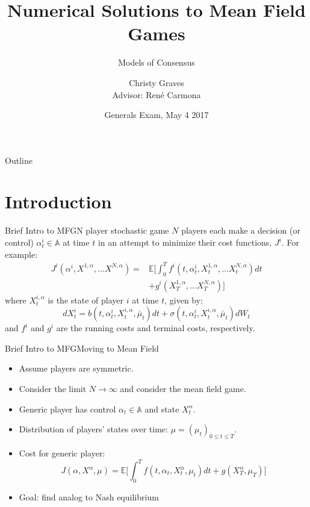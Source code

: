 \documentclass{beamer}
\title{Numerical Solutions to Mean Field Games}
\subtitle{Models of Consensus}
\author[Christy Graves]{Christy Graves\\{\small Advisor: Ren\'{e} Carmona}}
\institute[Princeton University] %
{
	Program in Applied and Computational Mathematics\\
	Princeton University
}
\date{Generals Exam, May 4 2017}
\begin{document}
\begin{frame}
  \titlepage
\end{frame}

\begin{frame}{Outline}
  \tableofcontents
\end{frame}

\section{Introduction}
\begin{frame}{Brief Intro to MFG}{N player stochastic game}
		$N$ players each make a decision (or control) $\alpha_t^i \in \mathbb{A}$ at time $t$ in an attempt to minimize their cost functions, $J^i$. For example:
		\begin{equation}
		\begin{split}
		J^i(\alpha^i,X^{1,\alpha},...X^{N,\alpha})=&\mathbb{E}\Bigg[\int_{0}^{T}f^i(t,\alpha_t^i,X_t^{1,\alpha},...X_t^{N,\alpha})dt \\
		&+g^i(X_T^{1,\alpha},...X_T^{N,\alpha}) \Bigg]
		\end{split}
		\end{equation}
		where $X_t^{i,\alpha}$ is the state of player $i$ at time $t$, given by:
		\begin{equation}
		dX_t^i=b(t,\alpha_t^i,X_t^{i,\alpha},\bar{\mu}_t)dt+\sigma(t,\alpha_t^i,X_t^{i,\alpha},\bar{\mu}_t)dW_t
		\end{equation}
		and $f^i$ and $g^i$ are the running costs and terminal costs, respectively.
\end{frame}

	\begin{frame}{Brief Intro to MFG}{Moving to Mean Field}
		\begin{itemize}
			\item {
				Assume players are symmetric.
			}
			\item {
				Consider the limit $N \rightarrow \infty$ and consider the mean field game.
		    }
			\item {
				Generic player has control $\alpha_t \in \mathbb{A}$ and state $X_t^{\alpha}$.
			}
			\item {
				Distribution of players' states over time: $\mu=(\mu_t)_{0 \leq t \leq T}$.
			}
			\item {
				Cost for generic player:
				\begin{equation}
				J(\alpha,X^{\alpha},\mu)=\mathbb{E}\Bigg[\int_{0}^{T}f(t,\alpha_t,X_t^{\alpha},\mu_t)dt+g(X_T^{\alpha},\mu_T) \Bigg]
				\end{equation}
			}
			\pause
			\item {
				Goal: find analog to Nash equilibrium
			}
		\end{itemize}
	\end{frame}
\end{document}
